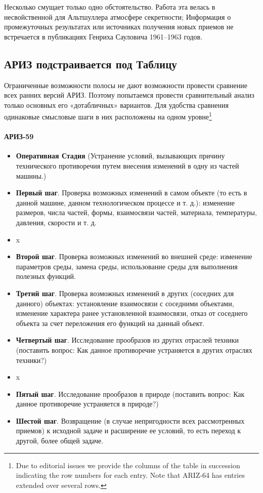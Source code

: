 \documentclass[11pt,a4paper]{article}
\begin{document}
Несколько смущает только одно обстоятельство. Работа эта велась в
несвойственной для Альтшуллера атмосфере секретности; Информация о
промежуточных результатах или источниках получения новых приемов не
встречается в публикациях Генриха Сауловича 1961--1963 годов.

\subsection*{АРИЗ подстраивается под Таблицу}

Ограниченные возможности полосы не дают возможности провести сравнение всех
ранних версий АРИЗ. Поэтому попытаемся провести сравнительный анализ только
основных его «дотабличных» вариантов. Для удобства сравнения одинаковые
смысловые шаги в них расположены на одном уровне\footnote{Due to editorial
  issues we provide the columns of the table in succession indicating the row
  numbers for each entry. Note that ARIZ-64 has entries extended over several
  rows.}

\paragraph{АРИЗ-59 \cite{Altshuller1959}}
\begin{itemize}
\item[(1)] \textbf{Оперативная Стадия} (Устранение условий, вызывающих причину
  технического противоречия путем внесения изменений в одну из частей машины.)
\item[(2)] \textbf{Первый шаг}. Проверка возможных изменений в самом объекте
  (то есть в данной машине, данном технологическом процессе и т. д.):
  изменение размеров, числа частей, формы, взаимосвязи частей, материала,
  температуры, давления, скорости и т. д.
\item[(3)] x
\item[(4)] \textbf{Второй шаг}. Проверка возможных изменений во внешней среде:
  изменение параметров среды, замена среды, использование среды для выполнения
  полезных функций.
\item[(5)] \textbf{Третий шаг}. Проверка возможных изменений в других
  (соседних для данного) объектах: установление взаимосвязи с соседними
  объектами, изменение характера ранее установленной взаимосвязи, отказ от
  соседнего объекта за счет переложения его функций на данный объект.
\item[(6)] \textbf{Четвертый шаг}. Исследование прообразов из других отраслей
  техники (поставить вопрос: Как данное противоречие устраняется в других
  отраслях техники?)
\item[(7)] x
\item[(8)] \textbf{Пятый шаг}. Исследование прообразов в природе (поставить
  вопрос: Как данное противоречие устраняется в природе?)
\item[(9)] \textbf{Шестой шаг}. Возвращение (в случае непригодности всех
  рассмотренных приемов) к исходной задаче и расширение ее условий, то есть
  переход к другой, более общей задаче.
\end{itemize}
\end{document}
